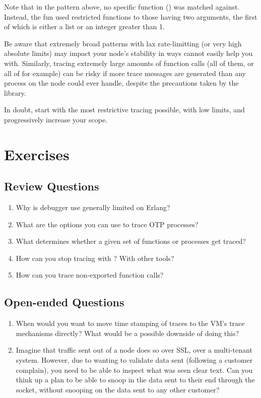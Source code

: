 \documentclass[11pt, oneside]{book}   	%
\begin{document}
Note that in the pattern above, no specific function () was matched against. Instead, the fun used restricted functions to those having two arguments, the first of which is either a list or an integer greater than 1.

Be aware that extremely broad patterns with lax rate-limitting (or very high absolute limits) may impact your node's stability in ways  cannot easily help you with. Similarly, tracing extremely large amounts of function calls (all of them, or all of  for example) can be risky if more trace messages are generated than any process on the node could ever handle, despite the precautions taken by the library.

In doubt, start with the most restrictive tracing possible, with low limits, and progressively increase your scope.


\section{Exercises}

\subsection*{Review Questions}

\begin{enumerate}
	\item Why is debugger use generally limited on Erlang?
	\item What are the options you can use to trace OTP processes?
	\item What determines whether a given set of functions or processes get traced?
	\item How can you stop tracing with ? With other tools?
	\item How can you trace non-exported function calls?
\end{enumerate}

\subsection*{Open-ended Questions}

\begin{enumerate}
	\item When would you want to move time stamping of traces to the VM's trace mechanisms directly? What would be a possible downside of doing this?	
	\item Imagine that traffic sent out of a node does so over SSL, over a multi-tenant system. However, due to wanting to validate data sent (following a customer complain), you need to be able to inspect what was seen clear text. Can you think up a plan to be able to snoop in the data sent to their end through the  socket, without snooping on the data sent to any other customer?
\end{enumerate}
\end{document}
